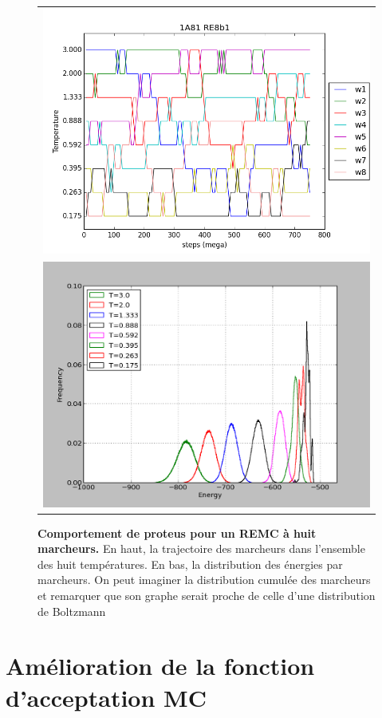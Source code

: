    \begin{figure}[!htbp]
     \centering
     \begin{tabular}{c}
       \includegraphics[width=12cm]{figure/re8_Ttraj.png}  \\
       \includegraphics[width=12cm]{figure/re8_distri.png} \\
     \end{tabular}     
     \caption{\textbf{Comportement de proteus pour un REMC à huit marcheurs.} En haut, la trajectoire des marcheurs dans l'ensemble des huit températures. En bas, la distribution des énergies par marcheurs. On peut imaginer la distribution cumulée des marcheurs et remarquer que son graphe serait proche de celle d'une distribution de Boltzmann}
\label{fig:proteusREMC}
   \end{figure}
   

\section{Amélioration de la fonction d'acceptation MC}

